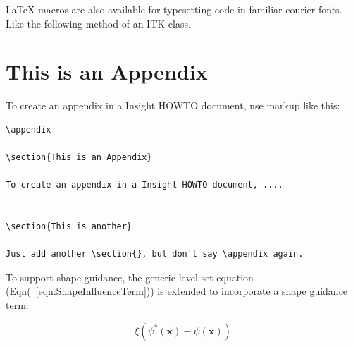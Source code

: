 \documentclass{InsightArticle}
\begin{document}

LaTeX macros are also available for typesetting code in familiar courier fonts.
Like the following method of an ITK class.







\appendix

\section{This is an Appendix}

To create an appendix in a Insight HOWTO document, use markup like
this:

\begin{verbatim}
\appendix

\section{This is an Appendix}

To create an appendix in a Insight HOWTO document, ....


\section{This is another}

Just add another \section{}, but don't say \appendix again.
\end{verbatim}



%
%


To support shape-guidance, the generic level set equation
(Eqn(~\ref{eqn:ShapeInfluenceTerm})) is extended to incorporate a shape guidance
term:

\begin{equation}
\label{eqn:ShapeInfluenceTerm}
\xi \left(\psi^{*}(\mathbf{x}) - \psi(\mathbf{x})\right)
\end{equation}




%
%



\end{document}
